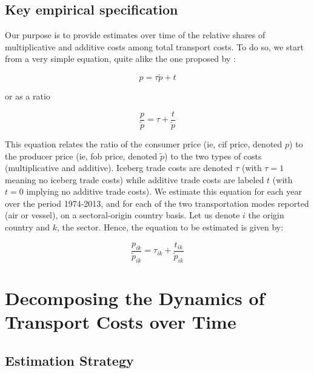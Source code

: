 \documentclass[a4paper,11pt]{article}
\begin{document}
\subsection{Key empirical specification}

\noindent Our purpose is to provide estimates over time of the relative shares of multiplicative and additive costs among total transport costs. To do so, we start from a very simple equation, quite alike the one proposed by \citet{hummels2010}:

\begin{equation}\label{eq:base}
p = \tau \widetilde{p} + t
\end{equation}

or as a ratio

\begin{equation}\label{eq:base_bis}
\frac{p}{\widetilde{p}} = \tau  + \frac{t}{\widetilde{p}}
\end{equation}

This equation relates the ratio of the consumer price (ie, cif price, denoted $p$) to the producer price (ie, fob price, denoted $\widetilde{p}$) to the two types of costs (multiplicative and additive). Iceberg trade costs are denoted $\tau$ (with $\tau=1$ meaning no iceberg trade costs) while additive trade costs are labeled $t$ (with $t=0$ implying no additive trade costs).
We estimate this equation for each year over the period 1974-2013, and for each of the two transportation modes reported (air or vessel), on a sectoral-origin country basis. Let us denote $i$ the origin country and $k$, the sector. Hence, the equation to be estimated is given by:

\begin{equation}\label{eq:base_estimee}
\frac{p_{ik}}{\widetilde{p}_{ik}} = \tau_{ik}+\frac{t_{ik}}{ \widetilde{p}_{ik}}
\end{equation}



\section{Decomposing the Dynamics of Transport Costs over Time}

\subsection{Estimation Strategy}
\end{document}
